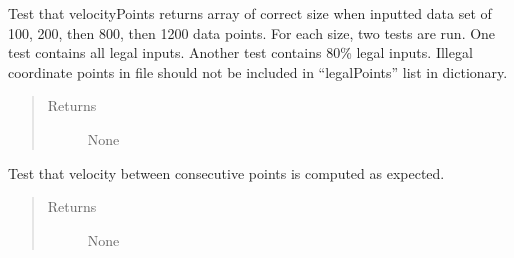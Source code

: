 \documentclass[letterpaper,10pt,english]{sphinxmanual}
\begin{document}
\begin{fulllineitems}
\begin{fulllineitems}
\begin{quote}
\begin{description}
\end{description}\end{quote}

\end{fulllineitems}


\begin{fulllineitems}
\label{\detokenize{index:src.Tests.Graph_Test.Graph_Test.test_velocityComputes_correctSize}}
Test that velocityPoints returns array of correct size when inputted data set of 100, 200, then 800,
then 1200 data points. For each size, two tests are run.
One test contains all legal inputs. Another test contains 80\% legal inputs.
Illegal coordinate points in file should not be included in “legalPoints” list in dictionary.
\begin{quote}\begin{description}
\item[{Returns}] \leavevmode
None

\end{description}\end{quote}

\end{fulllineitems}


\begin{fulllineitems}
\label{\detokenize{index:src.Tests.Graph_Test.Graph_Test.test_velocityPoints}}
Test that velocity between consecutive points is computed as expected.
\begin{quote}\begin{description}
\item[{Returns}] \leavevmode
None

\end{description}\end{quote}

\end{fulllineitems}


\end{fulllineitems}
\end{document}
